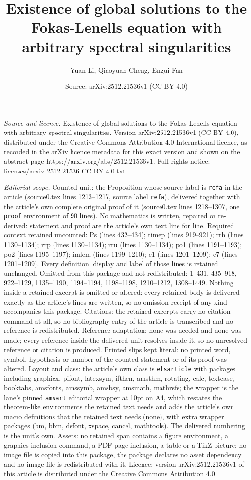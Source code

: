 \documentclass[10pt,a4paper]{amsart}
\title[Existence of global solutions to the Fokas-Lenells equation ]{Existence of global solutions to the Fokas-Lenells equation with arbitrary spectral singularities}
\author{Yuan Li, Qiaoyuan Cheng, Engui Fan}
\date{Source: arXiv:2512.21536v1 (CC BY 4.0)}
\begin{document}
\maketitle

\noindent\emph{Source and licence.} Existence of global solutions to the Fokas-Lenells equation with arbitrary spectral singularities. Version arXiv:2512.21536v1 (CC BY 4.0), distributed under the Creative Commons Attribution 4.0 International licence, as recorded in the arXiv licence metadata for this exact version and shown on the abstract page https://arxiv.org/abs/2512.21536v1. Full rights notice: licenses/arxiv-2512.21536-CC-BY-4.0.txt.\par\smallskip

\noindent\textit{Editorial scope.} Counted unit: the Proposition whose source label is \texttt{refa} in the article (source0.tex lines 1213--1217, source label \texttt{refa}), delivered together with the article's own complete original proof of it (source0.tex lines 1218--1307, one \texttt{proof} environment of 90 lines). No mathematics is written, repaired or re-derived: statement and proof are the article's own text line for line. Required context retained uncounted: Ps (lines 432--434); timep (lines 919--921); rrh (lines 1130--1134); rrp (lines 1130--1134); rru (lines 1130--1134); po1 (lines 1191--1193); po2 (lines 1195--1197); imlem (lines 1199--1210); e1 (lines 1201--1209); e7 (lines 1201--1209). Every definition, display and label of those lines is retained unchanged. Omitted from this package and not redistributed: 1--431, 435--918, 922--1129, 1135--1190, 1194--1194, 1198--1198, 1210--1212, 1308--1449. Nothing inside a retained excerpt is omitted or altered: every retained body is delivered exactly as the article's lines are written, so no omission receipt of any kind accompanies this package. Citations: the retained excerpts carry no citation command at all, so no bibliography entry of the article is transcribed and no reference is redistributed. Reference adaptation: none was needed and none was made; every reference inside the delivered unit resolves inside it, so no unresolved reference or citation is produced. Printed slips kept literal: no printed word, symbol, hypothesis or number of the counted statement or of its proof was altered. Layout and class: the article's own class is \texttt{elsarticle} with packages including graphicx, pifont, latexsym, ifthen, amsthm, rotating, calc, textcase, booktabs, amsfonts, amssymb, amsbsy, amsmath, mathrsfs; the wrapper is the lane's pinned \texttt{amsart} editorial wrapper at 10pt on A4, which restates the theorem-like environments the retained text needs and adds the article's own macro definitions that the retained text needs (none), with extra wrapper packages (bm, bbm, dsfont, xspace, cancel, mathtools). The delivered numbering is the unit's own. Assets: no retained span contains a figure environment, a graphics-inclusion command, a PDF-page inclusion, a table or a TikZ picture; no image file is copied into this package, the package declares no asset dependency and no image file is redistributed with it. Licence: version arXiv:2512.21536v1 of this article is distributed under the Creative Commons Attribution 4.0 
\end{document}
